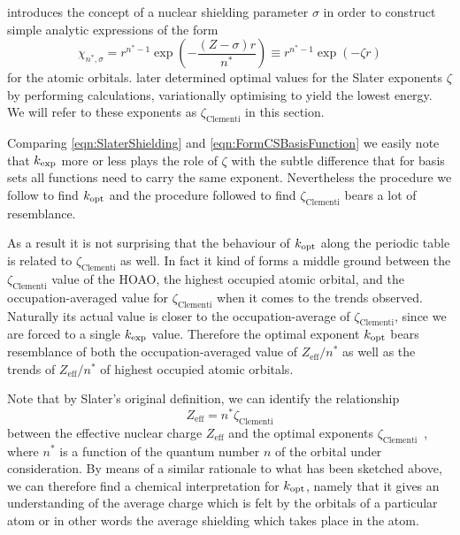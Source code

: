 \citet{Slater1930} introduces the concept of a nuclear shielding parameter $\sigma$
in order to construct simple analytic expressions of the form
\begin{equation}
	\chi_{n^\ast, \sigma} = r^{n^\ast - 1} \exp\left( - \frac{(Z - \sigma)r}{n^\ast} \right)
	\equiv r^{n^\ast - 1} \exp\left( -\zeta r\right)
	\label{eqn:SlaterShielding}
\end{equation}
for the atomic orbitals.
\citet{Clementi1963} later determined optimal values for the Slater exponents $\zeta$
by performing \HF calculations,
variationally optimising to yield the lowest energy.
We will refer to these exponents as $\zeta_\text{Clementi}$ in this section.

Comparing \eqref{eqn:SlaterShielding} and \eqref{eqn:FormCSBasisFunction}
we easily note that $k_\text{exp}$ more or less plays the role of $\zeta$
with the subtle difference that for \CS basis sets all functions
need to carry the same exponent.
Nevertheless the procedure we follow to find $k_\text{opt}$ and the procedure
\citeauthor{Clementi1963} followed to find $\zeta_\text{Clementi}$
bears a lot of resemblance.

As a result it is not surprising that the behaviour of $k_\text{opt}$
along the periodic table is related to $\zeta_\text{Clementi}$ as well.
In fact it kind of forms a middle ground between the $\zeta_\text{Clementi}$
value of the HOAO, the highest occupied atomic orbital,
and the occupation-averaged value for $\zeta_\text{Clementi}$
when it comes to the trends observed.
Naturally its actual value is closer to the occupation-average
of $\zeta_\text{Clementi}$,
since we are forced to a single $k_\text{exp}$ value.
Therefore the optimal exponent $k_\text{opt}$ bears resemblance of both
the occupation-averaged value of $Z_\text{eff} / n^\ast$
as well as the trends of $Z_\text{eff} / n^\ast$ of highest occupied
atomic orbitals.

Note that by Slater's original definition,
we can identify the relationship
\[ Z_\text{eff} = n^\ast \zeta_\text{Clementi} \]
between the effective nuclear charge $Z_\text{eff}$ and
the optimal exponents $\zeta_\text{Clementi}$~\cite{Slater1930},
where $n^\ast$ is a function of the quantum number $n$ of the orbital
under consideration.
By means of a similar rationale to what has been sketched above,
we can therefore find a chemical interpretation for $k_\text{opt}$,
namely that it gives an understanding of the average
charge which is felt by the orbitals of a particular atom
or in other words the average shielding which takes place in the atom.

